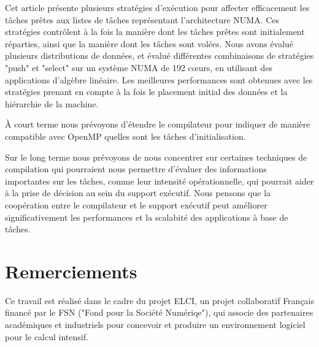 \documentclass[parallelisme]{compas2016}
\begin{document}
Cet article présente plusieurs stratégies d'exécution pour affecter efficacement
les tâches prêtes aux listes de tâches représentant l'architecture NUMA.
Ces stratégies contrôlent à la fois la manière dont les tâches prêtes sont
initialement réparties, ainsi que la manière dont les tâches sont volées.
Nous avons évalué plusieurs distributions de données, et évalué différentes
combinaisons de stratégies "push" et "select" sur un système NUMA de 192 cœurs,
en utilisant des applications d'algèbre linéaire.
Les meilleures performances sont obtenues avec les stratégies prenant en compte à
la fois le placement initial des données et la hiérarchie de la machine.

À court terme nous prévoyons d'étendre le compilateur pour indiquer de manière
compatible avec OpenMP quelles sont les tâches d'initialisation.

Sur le long terme nous prévoyons de nous concentrer sur certaines techniques
de compilation qui pourraient nous permettre d'évaluer des informations
importantes sur les tâches, comme leur intensité opérationnelle, qui pourrait
aider à la prise de décision au sein du support exécutif. Nous pensons
que la coopération entre le compilateur et le support exécutif peut améliorer
significativement les performances et la scalabité des applications à base de tâches.

\section*{Remerciements}
Ce travail est réalisé dans le cadre du projet ELCI, un projet collaboratif Français financé par le FSN ("Fond pour la Société Numériqe"), qui associe des partenaires académiques et industriels pour concevoir et produire un
environnement logiciel pour le calcul intensif.


\end{document}
